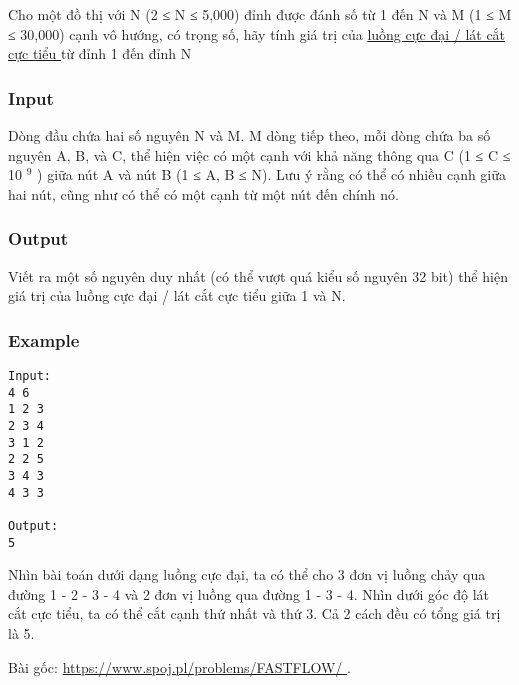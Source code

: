 



   Cho một đồ thị với N (2 ≤ N ≤ 5,000) đỉnh được đánh số từ 1 đến N và M (1 ≤ M ≤ 30,000) cạnh vô hướng, có trọng số, hãy tính giá trị của   \href{http://en.wikipedia.org/wiki/Maximum_flow_problem}{    luồng cực đại / lát cắt cực tiểu   }   từ đỉnh 1 đến đỉnh N  

\subsubsection{   Input  }

   Dòng đầu chứa hai số nguyên N và M. M dòng tiếp theo, mỗi dòng chứa ba số nguyên A, B, và C, thể hiện việc có một cạnh với khả năng thông qua C (1 ≤ C ≤ 10   $^    9   $   ) giữa nút A và nút B (1 ≤ A, B ≤ N). Lưu ý rằng có thể có nhiều cạnh giữa hai nút, cũng như có thể có một cạnh từ một nút đến chính nó.  

\subsubsection{   Output  }

   Viết ra một số nguyên duy nhất (có thể vượt quá kiểu số nguyên 32 bit) thể hiện giá trị của luồng cực đại / lát cắt cực tiểu giữa 1 và N.  

\subsubsection{   Example  }
\begin{verbatim}
Input:
4 6
1 2 3
2 3 4
3 1 2
2 2 5
3 4 3
4 3 3

Output:
5
\end{verbatim}

   Nhìn bài toán dưới dạng luồng cực đại, ta có thể cho 3 đơn vị luồng chảy qua đường 1 - 2 - 3 - 4 và 2 đơn vị luồng qua đường 1 - 3 - 4. Nhìn dưới góc độ lát cắt cực tiểu, ta có thể cắt cạnh thứ nhất và thứ 3. Cả 2 cách đều có tổng giá trị là 5.  

   Bài gốc:   \href{https://www.spoj.pl/problems/FASTFLOW/}{    https://www.spoj.pl/problems/FASTFLOW/   }   .  